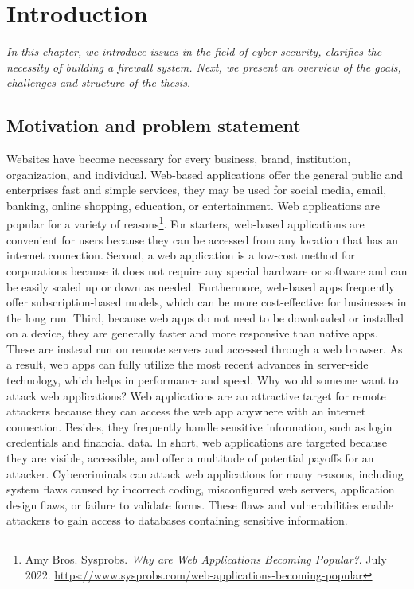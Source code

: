 \chapter{Introduction}
\label{chap:introduction}
	\textit{In this chapter, we introduce issues in the field of cyber security, clarifies the necessity of building a firewall system. Next, we present an overview of the goals, challenges and structure of the thesis.}
\minitoc

\section{Motivation and problem statement}
\label{sec:motivation}
Websites have become necessary for every business, brand, institution, organization, and individual. Web-based applications offer the general public and enterprises fast and simple services, they may be used for social media, email, banking, online shopping, education, or entertainment. Web applications are popular for a variety of reasons\footnote{Amy Bros. Sysprobs. \textit{Why are Web Applications Becoming Popular?}. July 2022. \url{https://www.sysprobs.com/web-applications-becoming-popular}}. For starters, web-based applications are convenient for users because they can be accessed from any location that has an internet connection. Second, a web application is a low-cost method for corporations because it does not require any special hardware or software and can be easily scaled up or down as needed. Furthermore, web-based apps frequently offer subscription-based models, which can be more cost-effective for businesses in the long run. Third, because web apps do not need to be downloaded or installed on a device, they are generally faster and more responsive than native apps. These are instead run on remote servers and accessed through a web browser. As a result, web apps can fully utilize the most recent advances in server-side technology, which helps in performance and speed. Why would someone want to attack web applications? Web applications are an attractive target for remote attackers because they can access the web app anywhere with an internet connection. Besides, they frequently handle sensitive information, such as login credentials and financial data. In short, web applications are targeted because they are visible, accessible, and offer a multitude of potential payoffs for an attacker. Cybercriminals can attack web applications for many reasons, including system flaws caused by incorrect coding, misconfigured web servers, application design flaws, or failure to validate forms. These flaws and vulnerabilities enable attackers to gain access to databases containing sensitive information. 


